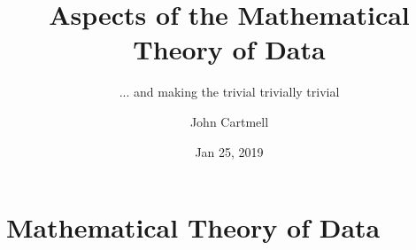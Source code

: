 

\usepackage{mathptmx}
\usepackage{amsfonts}
\usepackage{wasysym}
\usepackage{url}
\usepackage{hyperref}

\newcommand{\sharedmacros}{../../SharedMacros}









\renewcommand{\erpictureFolder}[0]{../../SharedPictures}
\setcounter{equation}{0}



\title[John Cartmell]{Aspects of the Mathematical Theory of Data}
\subtitle{... and making the trivial trivially trivial}
\author{John Cartmell}
\date{Jan 25, 2019}

\usepackage{framed}
\usepackage{bibentry}
\usepackage{colortbl}
\usepackage{ulem}   %
\usepackage{listings}

\nobibliography*



\begin{frame}
\titlepage
\end{frame}

\iffalse
\begin{frame}{Test}
\begin{description}	[longest label] 
\item<1->[short] Some text. 
\item<2->[longest label] Some text. 
\item<3->[long label] Some text. 
\end{description}
\end{frame}
\fi

\section{Mathematical Theory of Data}



